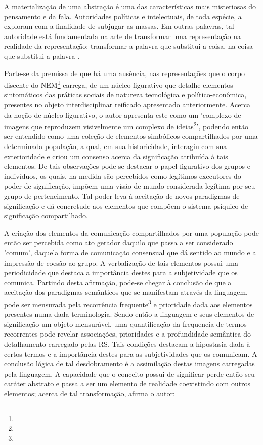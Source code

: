 \documentclass[
  12pt,       %
  openright,      %
  twoside,      %
  a4paper,      %
  english,      %
  french,       %
  spanish,      %
  brazil        %
  ]{abntex2}
\begin{document}
\begin{citacao}
A materialização de uma abstração é uma das características
mais misteriosas do pensamento e da fala. Autoridades políticas e
intelectuais, de toda espécie, a exploram com a finalidade de 
subjugar as massas.  Em outras palavras, tal autoridade está 
fundamentada na arte de transformar uma representação na realidade
da representação; transformar a palavra que substitui a coisa, na
coisa que substitui a palavra \cite[p.78]{Representacees_sociais_moscovici}.
\end{citacao}


Parte-se da premissa de que há uma ausência, nas representações que o corpo discente do NEM\footnote{} carrega, de um núcleo figurativo que detalhe elementos sintomáticos das práticas sociais de natureza tecnológica e político-econômica, presentes no objeto interdisciplinar reificado apresentado anteriormente. Acerca da noção de núcleo figurativo, o autor apresenta este como um 'complexo de imagens que reproduzem visivelmente um complexo de ideias\footnote{}', podendo então ser entendido como uma coleção de elementos simbólicos compartilhados por uma determinada população, a qual, em sua historicidade, interagiu com sua exterioridade e criou um consenso acerca da significação atribuída à tais elementos. De tais observações pode-se destacar o papel figurativo dos grupos e indivíduos, os quais, na medida são percebidos como legítimos executores do poder de significação, impõem uma visão de mundo considerada legítima por seu grupo de pertencimento. Tal poder leva à aceitação de novos paradigmas de significação e dá concretude aos elementos que compõem o sistema psíquico de significação compartilhado.

A criação dos elementos da comunicação compartilhados por uma população pode então ser percebida como ato gerador daquilo que passa a ser considerado 'comum', daquela forma de comunicação consensual  que dá sentido ao mundo e a impressão de coesão ao grupo. A verbalização de tais elementos possui uma periodicidade que destaca a importância destes para a subjetividade que os comunica. Partindo desta afirmação, pode-se chegar à conclusão de que a aceitação dos paradigmas semânticos que se manifestam através da linguagem, pode ser mensurada pela recorrência frequente\footnote{} e prioridade dada aos elementos presentes numa dada terminologia. Sendo então a linguagem e seus elementos de significação um objeto mensurável, uma quantificação da frequencia de termos recorrentes pode revelar associações, prioridades e a profundidade semântica do detalhamento carregado pelas RS. Tais condições destacam a hipostasia dada à certos termos e a importância destes para as subjetividades que os comunicam. A conclusão lógica de tal desdobramento é a assimilação destas imagens carregadas pela linguagem. A capacidade que o conceito possui de significar perde então seu caráter abstrato e passa a ser um elemento de realidade coexistindo com outros elementos; acerca de tal transformação, afirma o autor:
\end{document}
